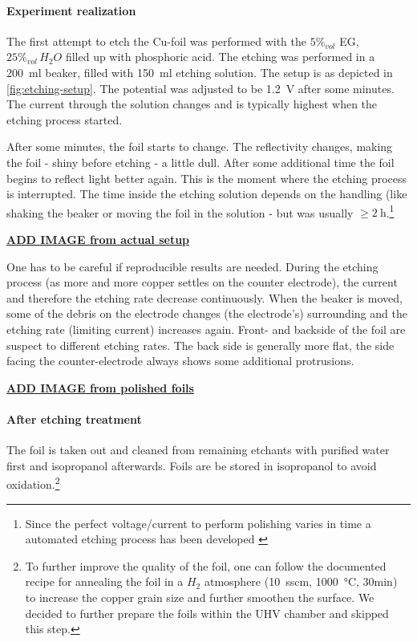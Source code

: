 
\paragraph{Experiment realization}The first attempt to etch the Cu-foil was performed with the $5\%_{vol}$ EG, $25\%_{vol}\,H_2O$ filled up with phosphoric acid. The etching was performed in a \SI{200}{\ml} beaker, filled with \SI{150}{\ml} etching solution. The setup is as depicted in \autoref{fig:etching-setup}. The potential was adjusted to be \SI{1.2}{\V} after some minutes. The current through the solution changes and is typically highest when the etching process started. 

After some minutes, the foil starts to change. The reflectivity changes, making the foil - shiny before etching - a little dull. After some additional time the foil begins to reflect light better again. This is the moment where the etching process is interrupted. The time inside the etching solution depends on the handling (like shaking the beaker or moving the foil in the solution - but was usually $\geq \SI{2}{\hour}$.\footnote{Since the perfect voltage/current to perform polishing varies in time a automated etching process has been developed \cite{palmieri_besides_2001}}

\underline{\textbf{ADD IMAGE from actual setup}}

One has to be careful if reproducible results are needed. During the etching process (as more and more copper settles on the counter electrode), the current and therefore the etching rate decrease continuously. When the beaker is moved, some of the debris on the electrode changes (the electrode's) surrounding and the etching rate (limiting current) increases again. Front- and backside of the foil are suspect to different etching rates. The back side is generally more flat, the side facing the counter-electrode always shows some additional protrusions.

\underline{\textbf{ADD IMAGE from polished foils}}
		
\paragraph{After etching treatment}
The foil is taken out and cleaned from remaining etchants with purified water first and isopropanol afterwards. Foils are be stored in isopropanol to avoid oxidation.\footnote{To further improve the quality of the foil, one can follow the documented recipe for annealing the foil in a $H_2$ atmosphere (\SI{10}{sscm}, \SI{1000}{\celsius}, 30min)\cite{kim_synthesis_2012} to increase the copper grain size and further smoothen the surface. We decided to further prepare the foils within the UHV chamber and skipped this step.}

